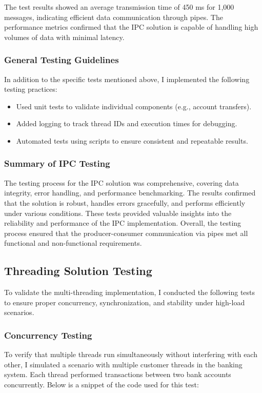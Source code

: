 \documentclass{article}
\begin{document}
The test results showed an average transmission time of 450 ms for 1,000 messages, indicating efficient data communication through pipes. The performance metrics confirmed that the IPC solution is capable of handling high volumes of data with minimal latency.

\subsubsection*{General Testing Guidelines}
In addition to the specific tests mentioned above, I implemented the following testing practices:
\begin{itemize}
    \item Used unit tests to validate individual components (e.g., account transfers).
    \item Added logging to track thread IDs and execution times for debugging.
    \item Automated tests using scripts to ensure consistent and repeatable results.
\end{itemize}

\subsubsection*{Summary of IPC Testing}
The testing process for the IPC solution was comprehensive, covering data integrity, error handling, and performance benchmarking. The results confirmed that the solution is robust, handles errors gracefully, and performs efficiently under various conditions. These tests provided valuable insights into the reliability and performance of the IPC implementation. Overall, the testing process ensured that the producer-consumer communication via pipes met all functional and non-functional requirements.

\subsection*{Threading Solution Testing}
To validate the multi-threading implementation, I conducted the following tests to ensure proper concurrency, synchronization, and stability under high-load scenarios.

\subsubsection*{Concurrency Testing}
To verify that multiple threads run simultaneously without interfering with each other, I simulated a scenario with multiple customer threads in the banking system. Each thread performed transactions between two bank accounts concurrently. Below is a snippet of the code used for this test:
\end{document}

